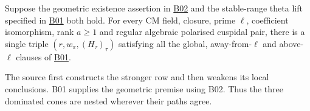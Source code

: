 
\begin{formalstatement}\label{sub:B03}
Suppose the geometric existence assertion in \hyperref[sub:B02]{B02} and
the stable-range theta lift specified in \hyperref[sub:B01]{B01} both
hold. For every CM field, closure, prime $\ell$, coefficient isomorphism,
rank $a\ge1$ and regular algebraic polarised cuspidal pair, there is a
single triple $(r,w_\pi,(H_\tau)_\tau)$ satisfying all the global,
away-from-$\ell$ and above-$\ell$ clauses of \hyperref[sub:B01]{B01}.
\end{formalstatement}
The source first constructs the stronger row and then weakens its local
conclusions. B01 supplies the geometric premise using B02. Thus the three
dominated cones are nested wherever their paths agree.
